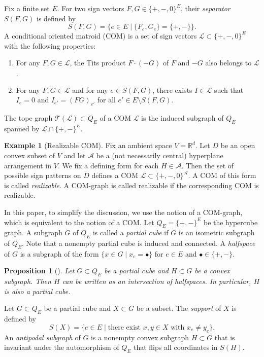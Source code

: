 \documentclass{amsart}
\numberwithin{equation}{section}
\newtheorem{prop}[thm]{Proposition}
\theoremstyle{plain}
\theoremstyle{remark}
\theoremstyle{definition}
\newtheorem{ex}[thm]{Example}
\numberwithin{equation}{section}
\newcommand{\A}{\mathcal{A}}
\begin{document}
Fix a finite set $E$.
For two sign vectors $F,G\in \{+,-,0\}^E$, their \emph{separator} $S(F,G)$ is defined by
\[
S(F,G)=\bigl\{e\in E\mid \{F_e,G_e\}=\{+,-\}\bigr\}.
\]
A conditional oriented matroid (COM) is a set of sign vectors $\mathcal{L}\subset \{+,-,0\}^E$ with the following properties:
\begin{enumerate}
    \item For any $F,G\in \mathcal{L}$, the Tits product $F\cdot(-G)$ of $F$ and $-G$ also belongs to $\mathcal{L}$.
    \item For any $F,G\in \mathcal{L}$ and for any $e\in S(F,G)$, there exists $I\in \mathcal{L}$ such that $I_e=0$ and $I_{e'} = (FG)_{e'}$ for all $e'\in E\setminus S(F,G)$.
\end{enumerate}
The tope graph $\mathcal{T}(\mathcal{L})\subset Q_E$ of a COM $\mathcal{L}$ is the induced subgraph of $Q_E$ spanned by $\mathcal{L}\cap \{+,-\}^E$.

\begin{ex}[Realizable COM]
    Fix an ambient space $V=\mathbb{R}^d$.
    Let $D$ be an open convex subset of $V$ and let $\A$ be a (not necessarily central) hyperplane arrangement in $V$.
    We fix a defining form for each $H\in \A$.
    Then the set of possible sign patterns on $D$ defines a COM $\mathcal{L}\subset \{+,-,0\}^\A$.
    A COM of this form is called \emph{realizable}.
    A COM-graph is called realizable if the corresponding COM is realizable.
\end{ex}

In this paper, to simplify the discussion, we use the notion of a COM-graph, which is equivalent to the notion of a COM.
Let $Q_E=\{+,-\}^E$ be the hypercube graph.
A subgraph $G$ of $Q_E$ is called a \emph{partial cube} if $G$ is an isometric subgraph of $Q_E$.
Note that a nonempty partial cube is induced and connected.
A \emph{halfspace} of $G$ is a subgraph of the form $\{x\in G\mid x_e=\bullet\}$ for $e\in E$ and $\bullet\in \{+,-\}$.

\begin{prop}[{\cite[Theorem 2]{Albenque-Knauer}}]
    Let $G\subset Q_E$ be a partial cube and $H\subset G$ be a convex subgraph.
    Then $H$ can be written as an intersection of halfspaces.
    In particular, $H$ is also a partial cube.
\end{prop}

Let $G\subset Q_E$ be a partial cube and $X\subset G$ be a subset.
The \emph{support} of $X$ is defined by
\[
S(X)=\{e\in E\mid \text{there exist } x,y\in X\text{ with }x_e\neq y_e\}.
\]
An \emph{antipodal subgraph} of $G$ is a nonempty convex subgraph $H\subset G$ that is invariant under the automorphism of $Q_E$ that flips all coordinates in $S(H)$.
\end{document}
